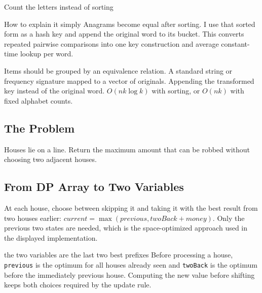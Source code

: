 \begin{visualbox}{Count the letters instead of sorting}
\centering
{}
\end{visualbox}
\begin{revisionbox}{How to explain it simply}
Anagrams become equal after sorting. I use that sorted form as a hash key and
append the original word to its bucket. This converts repeated pairwise
comparisons into one key construction and average constant-time lookup per
word.
\end{revisionbox}
\chaptercheckpoint
  {Items should be grouped by an equivalence relation.}
  {A standard string or frequency signature mapped to a vector of originals.}
  {Appending the transformed key instead of the original word.}
  {$O(nk\log k)$ with sorting, or $O(nk)$ with fixed alphabet counts.}
\judgeclassnote



\subsection{The Problem}
Houses lie on a line. Return the maximum amount that can be robbed without
choosing two adjacent houses.

\subsection{From DP Array to Two Variables}
At each house, choose between skipping it and taking it with the best result
from two houses earlier: \(current=\max(previous, twoBack+money).\)
Only the previous two states are needed, which is the space-optimized approach
used in the displayed implementation.

\begin{invariantbox}{the two variables are the last two best prefixes}
Before processing a house, \texttt{previous} is the optimum for all houses
already seen and \texttt{twoBack} is the optimum before the immediately
previous house. Computing the new value before shifting keeps both choices
required by the update rule.
\end{invariantbox}

